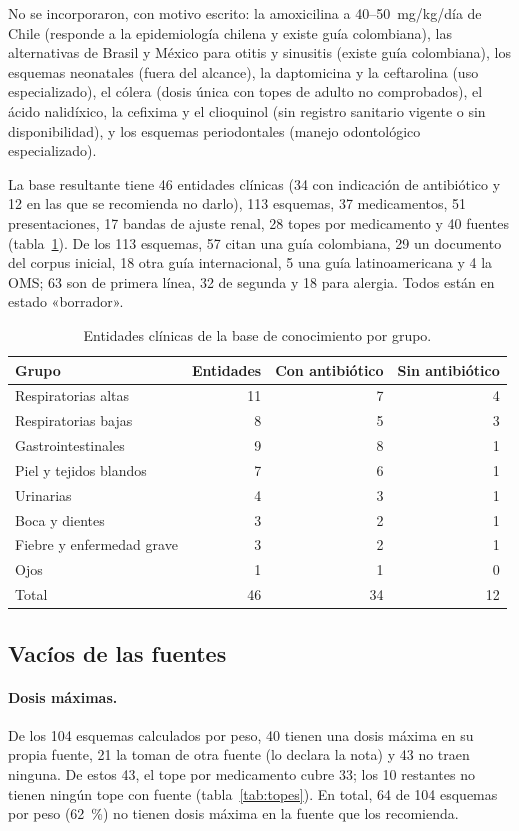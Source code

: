 \documentclass[11pt,a4paper]{article}
\begin{document}
No se incorporaron, con motivo escrito: la amoxicilina a 40--50~mg/kg/día de Chile (responde a la epidemiología chilena y existe guía colombiana), las alternativas de Brasil y México para otitis y sinusitis (existe guía colombiana), los esquemas neonatales (fuera del alcance), la daptomicina y la ceftarolina (uso especializado), el cólera (dosis única con topes de adulto no comprobados), el ácido nalidíxico, la cefixima y el clioquinol (sin registro sanitario vigente o sin disponibilidad), y los esquemas periodontales (manejo odontológico especializado).

La base resultante tiene 46 entidades clínicas (34 con indicación de antibiótico y 12 en las que se recomienda no darlo), 113 esquemas, 37 medicamentos, 51 presentaciones, 17 bandas de ajuste renal, 28 topes por medicamento y 40 fuentes (tabla~\ref{tab:base}). De los 113 esquemas, 57 citan una guía colombiana, 29 un documento del corpus inicial, 18 otra guía internacional, 5 una guía latinoamericana y 4 la OMS; 63 son de primera línea, 32 de segunda y 18 para alergia. Todos están en estado «borrador».

\begin{table}[htbp]
\centering
\caption{Entidades clínicas de la base de conocimiento por grupo.}
\label{tab:base}
\small
\begin{tabular}{@{}lrrr@{}}
\toprule
Grupo & Entidades & Con antibiótico & Sin antibiótico \\
\midrule
Respiratorias altas & 11 & 7 & 4 \\
Respiratorias bajas & 8 & 5 & 3 \\
Gastrointestinales & 9 & 8 & 1 \\
Piel y tejidos blandos & 7 & 6 & 1 \\
Urinarias & 4 & 3 & 1 \\
Boca y dientes & 3 & 2 & 1 \\
Fiebre y enfermedad grave & 3 & 2 & 1 \\
Ojos & 1 & 1 & 0 \\
\midrule
Total & 46 & 34 & 12 \\
\bottomrule
\end{tabular}
\end{table}

\subsection{Vacíos de las fuentes}

\paragraph{Dosis máximas.} De los 104 esquemas calculados por peso, 40 tienen una dosis máxima en su propia fuente, 21 la toman de otra fuente (lo declara la nota) y 43 no traen ninguna. De estos 43, el tope por medicamento cubre 33; los 10 restantes no tienen ningún tope con fuente (tabla~\ref{tab:topes}). En total, 64 de 104 esquemas por peso (62~\%) no tienen dosis máxima en la fuente que los recomienda.
\end{document}
